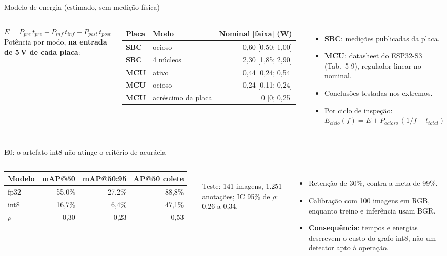 \documentclass[aspectratio=169,11pt]{beamer}
\newcommand{\mcu}{\textcolor{roxo}{\textbf{MCU}}}
\newcommand{\sbc}{\textcolor{azul}{\textbf{SBC}}}
\newcommand{\destaque}[1]{\textcolor{azul}{\textbf{#1}}}
\begin{document}
\begin{frame}{Modelo de energia (estimado, sem medição física)}
\begin{columns}[T]
\footnotesize
$E=P_{pre}\,t_{pre}+P_{inf}\,t_{inf}+P_{post}\,t_{post}$\\[3pt]
Potência por modo, \destaque{na entrada de 5\,V de cada placa}:\\[3pt]
\begin{tabular}{llr}\toprule
Placa & Modo & Nominal [faixa] (W)\\\midrule
\sbc & ocioso & 0,60 [0,50; 1,00]\\
\sbc & 4 núcleos & 2,30 [1,85; 2,90]\\
\mcu & ativo & 0,44 [0,24; 0,54]\\
\mcu & ocioso & 0,24 [0,11; 0,24]\\
\mcu & acréscimo da placa & 0 [0; 0,25]\\\bottomrule
\end{tabular}
\small
\begin{itemize}
\item \sbc: medições publicadas da placa.
\item \mcu: datasheet do ESP32-S3 (Tab.\ 5-9), regulador linear no nominal.
\item Conclusões testadas nos extremos.
\item Por ciclo de inspeção:\\[2pt]
$E_{ciclo}(f)=E+P_{ocioso}\,(1/f-t_{total})$
\end{itemize}
\end{columns}
\end{frame}

\begin{frame}{E0: o artefato int8 não atinge o critério de acurácia}
\begin{columns}[T]
\small
\begin{tabular}{lrrr}\toprule
Modelo & mAP@50 & mAP@50:95 & AP@50 colete\\\midrule
fp32 & 55,0\% & 27,2\% & 88,8\%\\
int8 & 16,7\% & 6,4\% & 47,1\%\\\midrule
$\rho$ & \textcolor{azul}{0,30} & 0,23 & 0,53\\\bottomrule
\end{tabular}\\[3pt]
{\scriptsize\color{cinza} Teste: 141 imagens, 1.251 anotações; IC 95\% de $\rho$: 0,26 a 0,34.}
\begin{itemize}\small
\item Retenção de 30\%, contra a meta de 99\%.
\item Calibração com 100 imagens em RGB, enquanto treino e inferência usam BGR.
\item \destaque{Consequência}: tempos e energias descrevem o custo do grafo int8, não um detector apto à operação.
\end{itemize}
\end{columns}
\end{frame}
\end{document}
